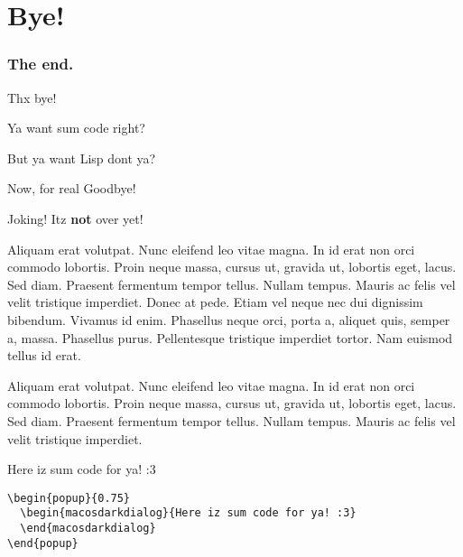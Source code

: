 \documentclass[aspectratio=169]{beamer}
\begin{document}
\section{Bye!}
\newcommand{\monly}[2]{\only<#1>{#2}}
\begin{frame}[fragile]
  \frametitle{The end.}
  Thx bye!
  \pause

  \pause
  Ya want sum code right?
  \pause

  \pause
  But ya want Lisp dont ya?
  \pause

  \pause
  \begin{block}{Now, for real}
    Goodbye!
  \end{block}

  \begin{popup}{0.75}
    \begin{macosdialog}{Joking!}
      Itz \textbf{not} over yet!

      Aliquam erat volutpat. Nunc eleifend leo vitae magna. In id erat non
      orci commodo lobortis. Proin neque massa, cursus ut, gravida ut,
      lobortis eget, lacus. Sed diam. Praesent fermentum tempor tellus. Nullam
      tempus. Mauris ac felis vel velit tristique imperdiet. Donec at pede.
      Etiam vel neque nec dui dignissim bibendum. Vivamus id enim. Phasellus
      neque orci, porta a, aliquet quis, semper a, massa. Phasellus purus.
      Pellentesque tristique imperdiet tortor. Nam euismod tellus id erat.

      Aliquam erat volutpat. Nunc eleifend leo vitae magna. In id erat non
      orci commodo lobortis. Proin neque massa, cursus ut, gravida ut,
      lobortis eget, lacus. Sed diam. Praesent fermentum tempor tellus. Nullam
      tempus. Mauris ac felis vel velit tristique imperdiet.
    \end{macosdialog}

    \begin{macosdarkdialog}{Here iz sum code for ya! :3}
      \begin{verbatim}
\begin{popup}{0.75}
  \begin{macosdarkdialog}{Here iz sum code for ya! :3}
  \end{macosdarkdialog}
\end{popup}
      \end{verbatim}
    \end{macosdarkdialog}
  \end{popup}


\end{frame}
\end{document}
